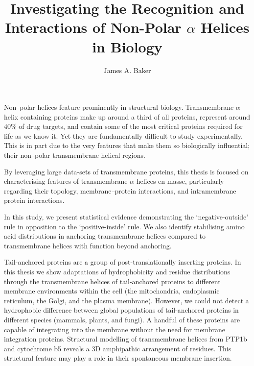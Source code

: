 \documentclass[12pt,PhD,twoside]{muthesis}
\begin{document}
\sloppy

\title{Investigating the Recognition and Interactions of Non-Polar \(\alpha\) Helices in Biology}
\author{James A. Baker}
\def\wordcount{47,705}






\beforeabstract{} %


Non\---polar helices feature prominently in structural biology.
Transmembrane \(\alpha\) helix containing proteins make up around a third of all proteins, represent around 40\% of drug targets, and contain some of the most critical proteins required for life as we know it.
Yet they are fundamentally difficult to study experimentally.
This is in part due to the very features that make them so biologically influential; their non\---polar transmembrane helical regions.

By leveraging large data-sets of transmembrane proteins, this thesis is focused on characterising features of transmembrane \(\alpha\) helices en masse, particularly regarding their topology, membrane\---protein interactions, and intramembrane protein interactions.

In this study, we present statistical evidence demonstrating the `negative\--outside' rule in opposition to the `positive\--inside' rule.
We also identify stabilising amino acid distributions in anchoring transmembrane helices compared to transmembrane helices with function beyond anchoring.

Tail\--anchored proteins are a group of post\--translationally inserting proteins.
In this thesis we show adaptations of hydrophobicity and residue distributions through the transmembrane helices of tail\--anchored proteins to different membrane environments within the cell (the mitochondria, endoplasmic reticulum, the Golgi, and the plasma membrane).
However, we could not detect a hydrophobic difference between global populations of tail\--anchored proteins in different species (mammals, plants, and fungi).
A handful of these proteins are capable of integrating into the membrane without the need for membrane integration proteins.
Structural modelling of transmembrane helices from PTP1b and cytochrome b5 reveals a 3D amphipathic arrangement of residues.
This structural feature may play a role in their spontaneous membrane insertion.
\end{document}

